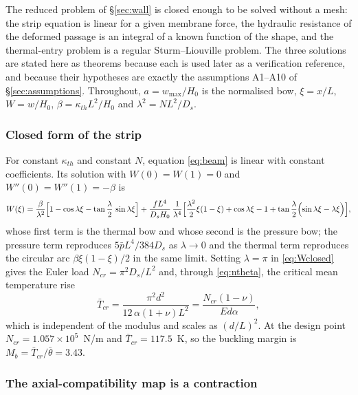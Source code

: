\documentclass[11pt,a4paper]{article}
\begin{document}
The reduced problem of \S\ref{sec:wall} is closed enough to be solved without a mesh: the
strip equation is linear for a given membrane force, the hydraulic resistance of the deformed
passage is an integral of a known function of the shape, and the thermal-entry problem is a
regular Sturm--Liouville problem. The three solutions are stated here as theorems because
each is used later as a verification reference, and because their hypotheses are exactly the
assumptions A1--A10 of \S\ref{sec:assumptions}. Throughout, $a=w_{\max}/H_0$ is the
normalised bow, $\xi=x/L$, $W=w/H_0$, $\beta=\kappa_{th}L^2/H_0$ and
$\lambda^2=NL^2/D_s$.

\subsubsection{Closed form of the strip}
\label{sec:stripclosed}

For constant $\kappa_{th}$ and constant $N$, equation \eqref{eq:beam} is linear with constant
coefficients. Its solution with $W(0)=W(1)=0$ and $W''(0)=W''(1)=-\beta$ is
\begin{equation}
W(\xi)=\frac{\beta}{\lambda^2}\Bigl[1-\cos\lambda\xi-\tan\frac{\lambda}{2}\,\sin\lambda\xi\Bigr]
+\frac{f L^4}{D_sH_0}\,
\frac{1}{\lambda^4}\Bigl[\frac{\lambda^2}{2}\xi(1-\xi)+\cos\lambda\xi-1
+\tan\frac{\lambda}{2}\Bigl(\sin\lambda\xi-\lambda\xi\Bigr)\Bigr],
\label{eq:Wclosed}
\end{equation}
whose first term is the thermal bow and whose second is the pressure bow; the pressure term
reproduces $5\bar pL^4/384D_s$ as $\lambda\to0$ and the thermal term reproduces the circular
arc $\beta\xi(1-\xi)/2$ in the same limit. Setting $\lambda=\pi$ in \eqref{eq:Wclosed} gives
the Euler load $N_{cr}=\pi^2D_s/L^2$ and, through \eqref{eq:ntheta}, the critical mean
temperature rise
\begin{equation}
\bar T_{cr}=\frac{\pi^2d^2}{12\,\alpha(1+\nu)L^2}=\frac{N_{cr}(1-\nu)}{Ed\alpha},
\label{eq:Tcr}
\end{equation}
which is independent of the modulus and scales as $(d/L)^2$. At the design point
$N_{cr}=1.057\times10^{5}$~N/m and $\bar T_{cr}=117.5$~K, so the buckling margin is
$M_b=\bar T_{cr}/\bar\theta=3.43$.

\subsubsection{The axial-compatibility map is a contraction}
\label{sec:contraction}
\end{document}
